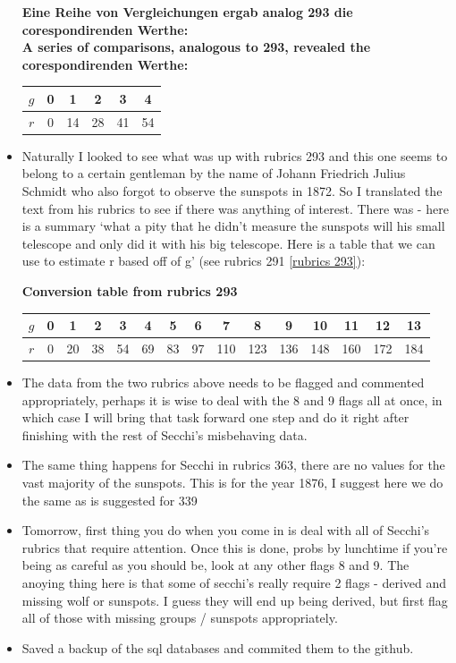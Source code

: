 \documentclass[12pt]{article}
\begin{document}
\begin{itemize}
{\centering
    \caption{\textbf{Eine Reihe von Vergleichungen ergab analog 293 die corespondirenden Werthe:\\
    A series of comparisons, analogous to 293, revealed the corespondirenden Werthe:}}
    \begin{tabular}{c|c c c c c}
        $g$ & 0 & 1 & 2 & 3 & 4 \\
        \hline
        $r$ & 0 & 14 & 28 & 41 & 54
    \end{tabular}
    
    \label{table:silly table}
\par}

    \item Naturally I looked to see what was up with rubrics 293 and this one seems to belong to a certain gentleman by the name of Johann Friedrich Julius Schmidt who also forgot to observe the sunspots in 1872. So I translated the text from his rubrics to see if there was anything of interest. There was - here is a summary `what a pity that he didn't measure the sunspots will his small telescope and only did it with his big telescope. Here is a table that we can use to estimate r based off of g' (see rubrics 291 \ref{rubrics 293}):
    
{\centering
    \caption{\textbf{Conversion table from rubrics 293}}
    \begin{tabular}{c|c c c c c c c c c c c c c c }
        $g$ & 0 & 1 & 2 & 3 & 4 & 5 & 6 & 7 & 8 & 9 & 10 & 11 & 12 & 13 \\
        \hline
        $r$ & 0 & 20 & 38 & 54 & 69 & 83 & 97 & 110 & 123 & 136 & 148 & 160 & 172 & 184
    \end{tabular}
    
    \label{table:silly table}
\par}

    \item The data from the two rubrics above needs to be flagged and commented appropriately, perhaps it is wise to deal with the 8 and 9 flags all at once, in which case I will bring that task forward one step and do it right after finishing with the rest of Secchi's misbehaving data.
    \item The same thing happens for Secchi in rubrics 363, there are no values for the vast majority of the sunspots. This is for the year 1876, I suggest here we do the same as is suggested for 339
    \item Tomorrow, first thing you do when you come in is deal with all of Secchi's rubrics that require attention. Once this is done, probs by lunchtime if you're being as careful as you should be, look at any other flags 8 and 9. The anoying thing here is that some of secchi's really require 2 flags - derived and missing wolf or sunspots. I guess they will end up being derived, but first flag all of those with missing groups / sunspots appropriately.
    \item Saved a backup of the sql databases and commited them to the github.
\end{itemize}
\end{document}
